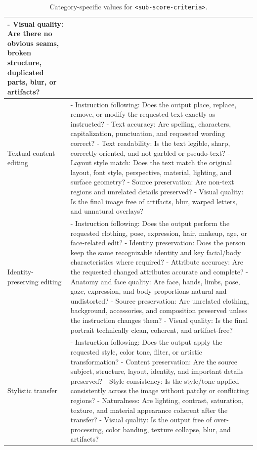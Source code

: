 \documentclass{llmxive}
\begin{document}
\begin{table}[t]
{\begin{tabular}{p{}p{}}
- Visual quality: Are there no obvious seams, broken structure, duplicated parts, blur, or artifacts? \\
\midrule
Textual content editing &
- Instruction following: Does the output place, replace, remove, or modify the requested text exactly as instructed? \newline
- Text accuracy: Are spelling, characters, capitalization, punctuation, and requested wording correct? \newline
- Text readability: Is the text legible, sharp, correctly oriented, and not garbled or pseudo-text? \newline
- Layout style match: Does the text match the original layout, font style, perspective, material, lighting, and surface geometry? \newline
- Source preservation: Are non-text regions and unrelated details preserved? \newline
- Visual quality: Is the final image free of artifacts, blur, warped letters, and unnatural overlays? \\
\midrule
Identity-preserving editing &
- Instruction following: Does the output perform the requested clothing, pose, expression, hair, makeup, age, or face-related edit? \newline
- Identity preservation: Does the person keep the same recognizable identity and key facial/body characteristics where required? \newline
- Attribute accuracy: Are the requested changed attributes accurate and complete? \newline
- Anatomy and face quality: Are face, hands, limbs, pose, gaze, expression, and body proportions natural and undistorted? \newline
- Source preservation: Are unrelated clothing, background, accessories, and composition preserved unless the instruction changes them? \newline
- Visual quality: Is the final portrait technically clean, coherent, and artifact-free? \\
\midrule
Stylistic transfer &
- Instruction following: Does the output apply the requested style, color tone, filter, or artistic transformation? \newline
- Content preservation: Are the source subject, structure, layout, identity, and important details preserved? \newline
- Style consistency: Is the style/tone applied consistently across the image without patchy or conflicting regions? \newline
- Naturalness: Are lighting, contrast, saturation, texture, and material appearance coherent after the transfer? \newline
- Visual quality: Is the output free of over-processing, color banding, texture collapse, blur, and artifacts? \\
\bottomrule
\end{tabular}
}
\caption{Category-specific values for \texttt{<sub-score-criteria>}.}
\label{tab:image_editing_prompt_subscore_criteria}
\end{table}
\end{document}

